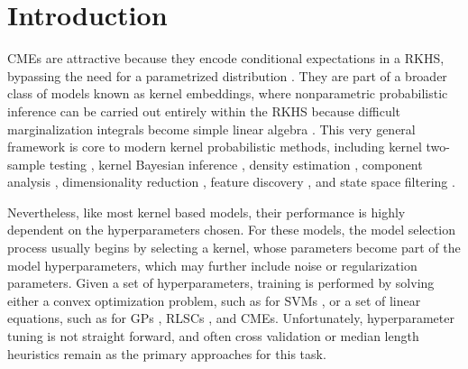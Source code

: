\documentclass[twoside]{article}
\begin{document}
	\section{Introduction}
	\label{sec:introduction}
	
		
		
		
		
		
		\Glspl{CME} are attractive because they encode conditional expectations in a \gls{RKHS}, bypassing the need for a parametrized distribution \citep{song2013kernel}. They are part of a broader class of models known as kernel embeddings, where nonparametric probabilistic inference can be carried out entirely within the \gls{RKHS} because difficult marginalization integrals become simple linear algebra \citep{muandet2016kernel}. This very general framework is core to modern kernel probabilistic methods, including kernel two-sample testing \citep{gretton2007kernel}, kernel Bayesian inference  \citep{fukumizu2013kernel}, density estimation \citep{song2008tailoring, kanagawa2014recovering}, component analysis \citep{muandet2013domain}, dimensionality reduction \citep{fukumizu2004dimensionality}, feature discovery \citep{jitkrittum2016interpretable}, and state space filtering \citep{kanagawa2016filtering}.
		
		

		
		
		Nevertheless, like most kernel based models, their performance is highly dependent on the hyperparameters chosen. For these models, the model selection process usually begins by selecting a kernel, whose parameters become part of the model hyperparameters, which may further include noise or regularization parameters. Given a set of hyperparameters, training is performed by solving either a convex optimization problem, such as for \glspl{SVM} \citep{scholkopf2002learning}, or a set of linear equations, such as for \gls{GPs} \citep{rasmussen2006gaussian}, \glspl{RLSC} \citep{rifkin2003regularized}, and \glspl{CME}. Unfortunately, hyperparameter tuning is not straight forward, and often cross validation \citep{song2013kernel} or median length heuristics \citep{muandet2016kernel} remain as the primary approaches for this task.
		
\end{document}
